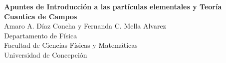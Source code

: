 \documentclass[main.tex]{subfiles}
\begin{document}
\thispagestyle{empty}
\begin{titlepage}
\centering

\vspace*{\fill}  %

{\Huge \textbf{Apuntes de Introducción a las partículas elementales y Teoría Cuantica de Campos}}\\[2cm]
{\Large Amaro A. Díaz Concha y Fernanda C. Mella Alvarez}\\[1cm]
{\normalsize Departamento de Física\\
Facultad de Ciencias Físicas y Matemáticas\\
Universidad de Concepción}\\[2cm]

\vspace*{\fill}  %

\end{titlepage}
\end{document}
